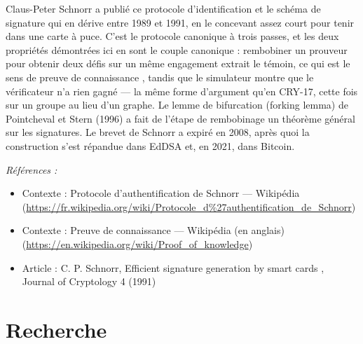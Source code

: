\documentclass[11pt]{article}
\newenvironment{refs}{\par\small\noindent\emph{Références :}\begin{itemize}\setlength\itemsep{0pt}}{\end{itemize}\normalsize}
\begin{document}
\noindent Claus-Peter Schnorr a publié ce protocole d'identification et le schéma de
signature qui en dérive entre 1989 et 1991, en le concevant assez court pour tenir dans une
carte à puce. C'est le protocole canonique à trois passes, et les deux propriétés démontrées
ici en sont le couple canonique : rembobiner un prouveur pour obtenir deux défis sur un même
engagement extrait le témoin, ce qui est le sens de \og{} preuve de connaissance \fg{}, tandis que le
simulateur montre que le vérificateur n'a rien gagné --- la même forme d'argument qu'en CRY-17,
cette fois sur un groupe au lieu d'un graphe. Le lemme de bifurcation (forking lemma) de
Pointcheval et Stern (1996) a fait de l'étape de rembobinage un théorème général sur les
signatures. Le brevet de Schnorr a expiré en 2008, après quoi la construction s'est répandue
dans EdDSA et, en 2021, dans Bitcoin.

\begin{refs}
\item Contexte : Protocole d'authentification de Schnorr --- Wikipédia (\url{https://fr.wikipedia.org/wiki/Protocole_d%27authentification_de_Schnorr})
\item Contexte : Preuve de connaissance --- Wikipédia (en anglais) (\url{https://en.wikipedia.org/wiki/Proof_of_knowledge})
\item Article : C. P. Schnorr, \og{} Efficient signature generation by smart cards \fg{}, Journal of Cryptology 4 (1991)
\end{refs}

\bigskip


\section*{Recherche}
\end{document}
